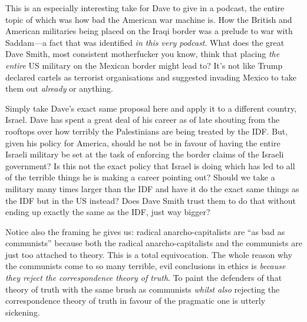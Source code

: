 \documentclass[11pt]{article}
\begin{document}
This is an especially interesting take for Dave to give in a podcast, the entire topic of which was how bad the American war machine is. How the British and American militaries being placed on the Iraqi border was a prelude to war with Saddam---a fact that was identified \emph{in this very podcast}. What does the great Dave Smith, most consistent motherfucker you know, think that placing \emph{the entire} US military on the Mexican border might lead to? It's not like Trump declared cartels as terrorist organisations and suggested invading Mexico to take them out \emph{already} or anything.

Simply take Dave's exact same proposal here and apply it to a different country, Israel. Dave has spent a great deal of his career as of late shouting from the rooftops over how terribly the Palestinians are being treated by the IDF. But, given his policy for America, should he not be in favour of having the entire Israeli military be set at the task of enforcing the border claims of the Israeli government? Is this not the exact policy that Israel is doing which has led to all of the terrible things he is making a career pointing out? Should we take a military many times larger than the IDF and have it do the exact same things as the IDF but in the US instead? Does Dave Smith trust them to do that without ending up exactly the same as the IDF, just way bigger?

Notice also the framing he gives us: radical anarcho-capitalists are ``as bad as communists'' because both the radical anarcho-capitalists and the communists are just too attached to theory. This is a total equivocation. The whole reason why the communists come to so many terrible, evil conclusions in ethics is \emph{because they reject the correspondence theory of truth}. To paint the defenders of that theory of truth with the same brush as communists \emph{whilst also} rejecting the correspondence theory of truth in favour of the pragmatic one is utterly sickening.
\end{document}
